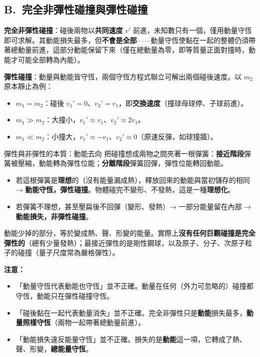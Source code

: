 \documentclass[11pt]{article}
\begin{document}
\subsection*{\sffamily B.\ 完全非彈性碰撞與彈性碰撞}

\textbf{完全非彈性碰撞}：碰後兩物以\textbf{共同速度} $v'$ 前進，未知數只有一個，僅用動量守恆即可求解。其動能損失最多，但\textbf{不會是全部}——動量守恆使黏在一起的整體仍須帶著總動量前進，這部分動能保留下來（僅在總動量為零，即等質量正面對撞時，動能才可能全部轉為內能）。

\textbf{彈性碰撞}：動量與動能皆守恆，兩個守恆方程式聯立可解出兩個碰後速度。以 $m_2$ 原本靜止為例：
\begin{itemize}\setlength{\itemsep}{1pt}
\item $m_1=m_2$：碰後 $v_1'=0$、$v_2'=v_1$，即\textbf{交換速度}（撞球母球停、子球前進）。
\item $m_1\gg m_2$：大撞小，$v_1'\approx v_1$、$v_2'\approx 2v_1$。
\item $m_1\ll m_2$：小撞大，$v_1'\approx -v_1$、$v_2'\approx 0$（原速反彈，如球撞牆）。
\end{itemize}

\begin{補充框}{彈性與非彈性的本質：動能去向}
把碰撞想成兩物之間夾著一根彈簧：\textbf{接近階段}彈簧被壓縮，動能轉為彈性位能；\textbf{分離階段}彈簧回彈，彈性位能轉回動能。
\begin{itemize}\setlength{\itemsep}{1pt}
\item 若這根彈簧是\textbf{理想}的（沒有能量漏成熱），釋放回來的動能與當初儲存的相同 → \textbf{動能守恆，彈性碰撞}。物體碰完不變形、不發熱，這是一種\textbf{理想化}。
\item 若彈簧不理想，甚至壓扁後不回彈（變形、發熱）→ 一部分能量留在內部 → \textbf{動能損失，非彈性碰撞}。
\end{itemize}
動能少掉的部分，等於變成熱、聲、形變的能量。實際上\textbf{沒有任何巨觀碰撞是完全彈性的}（總有少量發熱）；最接近彈性的是剛性鋼球，以及原子、分子、次原子粒子的碰撞（量子尺度常為嚴格彈性）。
\end{補充框}

\textbf{注意：}
\begin{itemize}\setlength{\itemsep}{1pt}
\item 「動量守恆代表動能也守恆」並不正確。動量在任何（外力可忽略的）碰撞都守恆，動能只在彈性碰撞守恆。
\item 「碰後黏在一起代表動量消失」並不正確。完全非彈性只是\textbf{動能}損失最多，\textbf{動量照樣守恆}（兩物一起帶著總動量前進）。
\item 「動能損失違反能量守恆」並不正確。損失的是\textbf{動能}這一項，它轉成了熱、聲、形變，\textbf{總能量守恆}。
\end{itemize}
\end{document}
